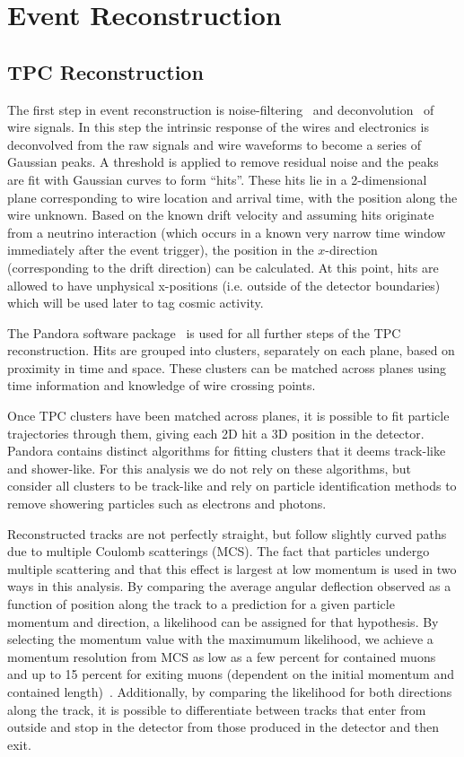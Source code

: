 \documentclass[%
twocolumn,
 amsmath,amssymb,
 aps,
prd,
superscriptaddress,showpacs]{revtex4-2}
\begin{document}
\section{Event Reconstruction} \label{sec:reconstruction}

\subsection{TPC Reconstruction}
The first step in event reconstruction is noise-filtering~\cite{Acciarri:2017sdeNOISE} and deconvolution~\cite{Adams:2018gbiPROCESS} of wire signals.
In this step the intrinsic response of the wires and electronics is deconvolved from the raw signals and wire waveforms to become a series of Gaussian peaks.
A threshold is applied to remove residual noise and the peaks are fit with Gaussian curves to form ``hits''.
These hits lie in a 2-dimensional plane corresponding to wire location and arrival time, with the position along the wire unknown.
Based on the known drift velocity and assuming hits originate from a neutrino interaction (which occurs in a known very narrow time window immediately after the event trigger), the position in the $x$-direction (corresponding to the drift direction) can be calculated.
At this point, hits are allowed to have unphysical x-positions (i.e. outside of the detector boundaries) which will be used later to tag cosmic activity.

The Pandora software package~\cite{Acciarri:2017hatPANDORA} is used for all further steps of the TPC reconstruction.
Hits are grouped into clusters, separately on each plane, based on proximity in time and space.
These clusters can be matched across planes using time information and knowledge of wire crossing points.

Once TPC clusters have been matched across planes, it is possible to fit particle trajectories through them, giving each 2D hit a 3D position in the detector.
Pandora contains distinct algorithms for fitting clusters that it deems track-like and shower-like.
For this analysis we do not rely on these algorithms, but consider all clusters to be track-like and rely on particle identification methods to remove showering particles such as electrons and photons.

Reconstructed tracks are not perfectly straight, but follow slightly curved paths due to multiple Coulomb scatterings (MCS).
The fact that particles undergo multiple scattering and that this effect is largest at low momentum is used in two ways in this analysis.
By comparing the average angular deflection observed as a function of position along the track to a prediction for a given particle momentum and direction, a likelihood can be assigned for that hypothesis.
By selecting the momentum value with the maximumum likelihood, we achieve a momentum resolution from MCS as low as a few percent for contained muons and up to 15 percent for exiting muons (dependent on the initial momentum and contained length)~\cite{Abratenko:2017nkiMCS}.
Additionally, by comparing the likelihood for both directions along the track, it is possible to differentiate between tracks that enter from outside and stop in the detector from those produced in the detector and then exit.
\end{document}
